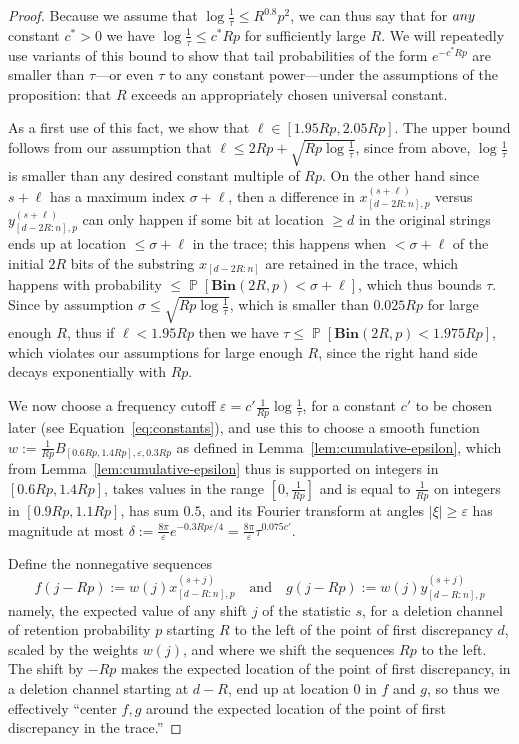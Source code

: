 \documentclass[10pt,a4paper]{amsart}
\newcommand{\Bin}[2]{\textbf{Bin}(#1,#2)}
\newcommand{\eps}{\varepsilon}
\renewcommand{\Pr}{\operatorname*{\mathbb{P}}}
\begin{document}
\begin{proof}
Because we assume that $\log\frac{1}{\tau}\leq R^{0.8}p^2$, we can thus say that for $\emph{any}$ constant $c^*>0$ we have $\log\frac{1}{\tau}\leq c^* R p$ for sufficiently large $R$. We will repeatedly use variants of this bound to show that tail probabilities of the form $e^{-c^*Rp}$ are smaller than $\tau$---or even $\tau$ to any constant power---under the assumptions of the proposition: that $R$ exceeds an appropriately chosen universal constant.

As a first use of this fact, we show that $\ell\in [1.95Rp,2.05Rp]$. The upper bound follows from our assumption that $\ell\leq 2Rp+ \sqrt{R p\log\frac{1}{\tau}}$, since from above, $\log\frac{1}{\tau}$ is smaller than any desired constant multiple of $Rp$. On the other hand since $s+\ell$ has a maximum index $\sigma+\ell$, then a difference in $x_{[d-2R:n],p}^{(s+\ell)}$ versus $y_{[d-2R:n],p}^{(s+\ell)}$ can only happen if some bit at location $\geq d$ in the original strings ends up at location $\leq \sigma+\ell$ in the trace; this happens when $<\sigma+\ell$ of the initial $2R$ bits of the substring $x_{[d-2R:n]}$ are retained in the trace, which happens with probability $\leq \Pr[\Bin{2R}{p}<\sigma+\ell]$, which thus bounds $\tau$. Since by assumption $\sigma\leq  \sqrt{Rp\log\frac{1}{\tau}}$, which is smaller than $0.025Rp$ for large enough $R$, thus if $\ell<1.95Rp$ then we have $\tau\leq  \Pr[\Bin{2R}{p}<1.975Rp]$, which violates our assumptions for large enough $R$, since the right hand side decays exponentially with $Rp$.

We now choose a frequency cutoff $\eps=c' \frac{1}{Rp}\log\frac{1}{\tau}$, for a constant $c'$ to be chosen later (see Equation~\ref{eq:constants}), and use this to choose a smooth function $w:=\frac{1}{Rp} B_{[0.6Rp,1.4Rp],\eps,0.3Rp}$ as defined in Lemma~\ref{lem:cumulative-epsilon}, which from Lemma~\ref{lem:cumulative-epsilon} thus is supported on integers in $[0.6Rp,1.4Rp]$, takes values in the range $[0,\frac{1}{Rp}]$ and is equal to $\frac{1}{Rp}$ on integers in $[0.9Rp,1.1Rp]$, has sum $0.5$, and its Fourier transform at angles $|\xi|\geq \eps$ has magnitude at most $\delta:=\frac{8\pi}{\eps} e^{-0.3 Rp \eps/4}=\frac{8\pi}{\eps} \tau^{0.075 c'}$.

Define the nonnegative sequences \[f(j-Rp):=w(j) x^{(s+j)}_{[d-R:n],p} \quad\textrm{and}\quad g(j-Rp):=w(j) y^{(s+j)}_{[d-R:n],p}\] namely, the expected value of any shift $j$ of the statistic $s$, for a deletion channel of retention probability $p$ starting $R$ to the left of the point of first discrepancy $d$, scaled by the weights $w(j)$, and where we shift the sequences $Rp$ to the left. The shift by $-Rp$ makes the expected location of the point of first discrepancy, in a deletion channel starting at $d-R$, end up at location 0 in $f$ and $g$, so thus we effectively ``center $f,g$ around the expected location of the point of first discrepancy in the trace.''


\end{proof}
\end{document}
